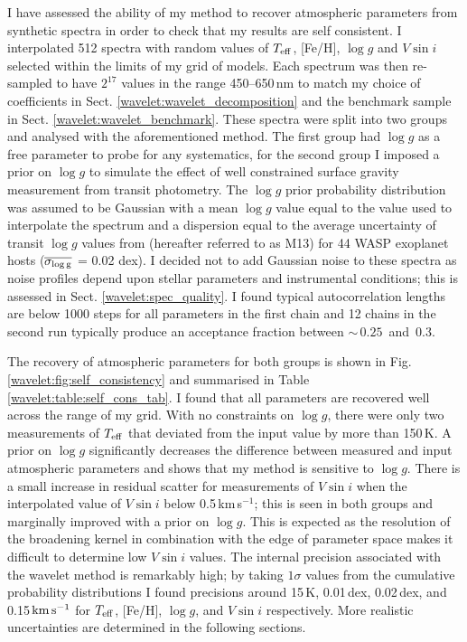 I have assessed  the ability of my method to recover atmospheric parameters from synthetic spectra in order to check that my results are self consistent. I interpolated 512 spectra with random values of $T_{\rm eff}$, [Fe/H], $\log g$ and $V \sin i$ selected within the limits of my grid of models. Each spectrum was then re-sampled to have $2^{17}$ values in the range 450--650\,nm to match my choice of coefficients in Sect. \ref{wavelet:wavelet_decomposition} and the benchmark sample in Sect. \ref{wavelet:wavelet_benchmark}. These spectra were split into two groups and analysed with the aforementioned method. The first group had $\log g$ as a free parameter to probe for any systematics, for the second group I imposed a prior on $\log g$ to simulate the effect of well constrained surface gravity measurement from transit photometry. The  $\log g$ prior probability distribution was assumed to be Gaussian with a mean $\log g$ value equal to the value used to interpolate the spectrum and a dispersion equal to the average uncertainty of transit $\log g$ values from \citet{26A...558A.106M} (hereafter referred to as M13) for 44 WASP exoplanet hosts ($\overline{\sigma_{\rm \log g}}$ = 0.02 dex). I decided not to add Gaussian noise to these spectra as noise profiles depend upon stellar parameters and instrumental conditions; this is assessed  in Sect. \ref{wavelet:spec_quality}. I found typical autocorrelation lengths are below 1000 steps for all parameters in the first chain and 12 chains in the second run typically produce an acceptance fraction between $\sim\,0.25\,$ and $\,0.3$.  

The recovery of atmospheric parameters for both groups is shown in Fig.  \ref{wavelet:fig:self_consistency} and summarised in Table \ref{wavelet:table:self_cons_tab}. I found that all parameters are recovered well across the range of my grid. With no constraints on $\log g$, there were only two measurements of $T_{\rm eff}$ that deviated from the input value by more than 150\,K. A prior on $\log g$ significantly decreases the difference between measured and input atmospheric parameters and shows that my method is sensitive to $\log g$. There is a small increase in residual scatter for measurements of $V \sin i$ when the interpolated value of $V \sin i$ below 0.5\,km\,s$^{-1}$; this is seen in both groups and marginally improved with a prior on $\log g$. This is expected as the resolution of the broadening kernel in combination with the edge of parameter space makes it difficult to determine low $V \sin i$ values. The internal precision associated with the wavelet method is remarkably high; by taking $1\sigma$ values from the cumulative probability distributions I found precisions around 15\,K, 0.01\,dex, 0.02\,dex, and 0.15\,$\rm km\,s^{-1}$ for $T_{\rm eff}$, [Fe/H], $\log g$, and $V \sin i$ respectively. More realistic uncertainties are determined in the following sections. 

